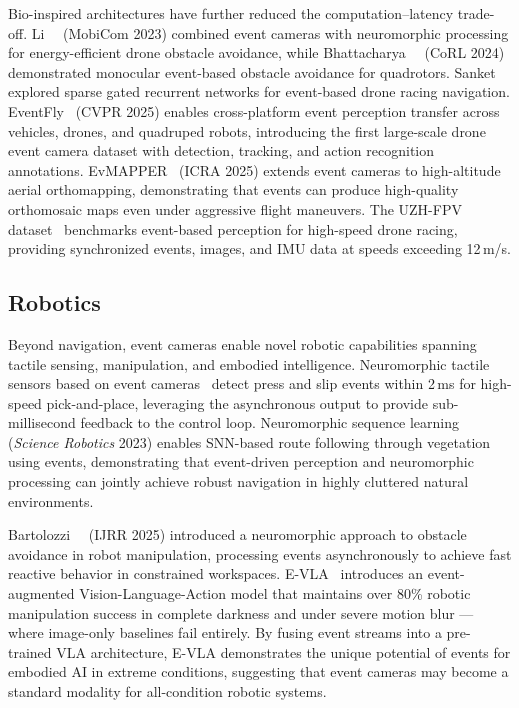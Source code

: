 Bio-inspired architectures have further reduced the computation--latency trade-off. Li~\etal~\cite{li2023tamingdrone} (MobiCom 2023) combined event cameras with neuromorphic processing for energy-efficient drone obstacle avoidance, while Bhattacharya~\etal~\cite{bhattacharya2024monocorl} (CoRL 2024) demonstrated monocular event-based obstacle avoidance for quadrotors. Sanket~\etal~\cite{sanket2022navdrone} explored sparse gated recurrent networks for event-based drone racing navigation. EventFly~\cite{kong2025eventfly} (CVPR 2025) enables cross-platform event perception transfer across vehicles, drones, and quadruped robots, introducing the first large-scale drone event camera dataset with detection, tracking, and action recognition annotations. EvMAPPER~\cite{muglikar2025evmapper} (ICRA 2025) extends event cameras to high-altitude aerial orthomapping, demonstrating that events can produce high-quality orthomosaic maps even under aggressive flight maneuvers. The UZH-FPV dataset~\cite{delmerico2019uzhfpv} benchmarks event-based perception for high-speed drone racing, providing synchronized events, images, and IMU data at speeds exceeding 12\,m/s.


\subsection{Robotics}
\label{sec:appl_robotics}

Beyond navigation, event cameras enable novel robotic capabilities spanning tactile sensing, manipulation, and embodied intelligence. Neuromorphic tactile sensors based on event cameras~\cite{zhang2024tactile} detect press and slip events within 2\,ms for high-speed pick-and-place, leveraging the asynchronous output to provide sub-millisecond feedback to the control loop. Neuromorphic sequence learning~\cite{shrestha2023neuromorphicroute} (\textit{Science Robotics} 2023) enables SNN-based route following through vegetation using events, demonstrating that event-driven perception and neuromorphic processing can jointly achieve robust navigation in highly cluttered natural environments.

Bartolozzi~\etal~\cite{bartolozzi2025obstacle} (IJRR 2025) introduced a neuromorphic approach to obstacle avoidance in robot manipulation, processing events asynchronously to achieve fast reactive behavior in constrained workspaces. E-VLA~\cite{miao2026evla} introduces an event-augmented Vision-Language-Action model that maintains over 80\% robotic manipulation success in complete darkness and under severe motion blur --- where image-only baselines fail entirely. By fusing event streams into a pre-trained VLA architecture, E-VLA demonstrates the unique potential of events for embodied AI in extreme conditions, suggesting that event cameras may become a standard modality for all-condition robotic systems.


